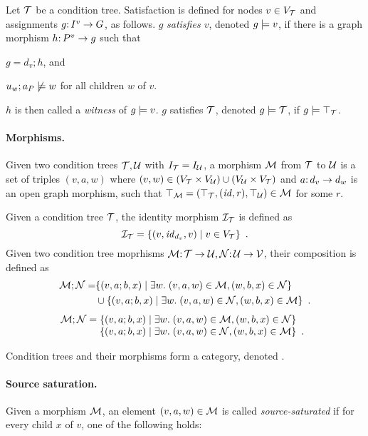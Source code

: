 Let ${\mathcal{T}}$ be a condition tree. Satisfaction is defined for nodes $v\in V_{\mathcal{T}}$ and assignments $g{:}\, I^v\rightarrow G$, as follows. $g$ \emph{satisfies $v$}, denoted $g\models v$, if there is a graph morphism $h{:}\, P^v\rightarrow g$ such that
\begin{inumerate}
\item $g=d_v;h$, and 
\item $u_w;a_P\not\models w$ for all children $w$ of $v$.
\end{inumerate}
$h$ is then called a \emph{witness} of $g\models v$.
$g$ satisfies ${\mathcal{T}}$, denoted $g\models{\mathcal{T}}$, if $g\models\top_{{\mathcal{T}}}$.

\paragraph{Morphisms.}

Given two condition trees ${\mathcal{T}},{\mathcal{U}}$ with $I_{\mathcal{T}}=I_{\mathcal{U}}$, a morphism ${\mathcal{M}}$ from ${\mathcal{T}}$ to ${\mathcal{U}}$ is a set of triples $(v,a,w)$ where $(v,w)\in (V_{\mathcal{T}}\times V_{\mathcal{U}})\cup (V_{\mathcal{U}}\times V_{\mathcal{T}})$ and $a{:}\, d_v\rightarrow d_w$ is an open graph morphism, such that $\top_{{\mathcal{M}}}=(\top_{{\mathcal{T}}},({\mathit{id}},r),\top_{{\mathcal{U}}})\in {\mathcal{M}}$ for some $r$.

Given a condition tree ${\mathcal{T}}$, the identity morphism ${\mathcal{I}}_{\mathcal{T}}$ is defined as
\[ {\mathcal{I}}_{\mathcal{T}} = \{{(v,{\mathit{id}}_{d_v},v)\mid v\in V_{\mathcal{T}}}\} \enspace. \]
Given two condition tree moprhisms ${\mathcal{M}}{:}\, {\mathcal{T}}\rightarrow {\mathcal{U}},{\mathcal{N}}{:}\, {\mathcal{U}}\rightarrow {\mathcal{V}}$, their composition is defined as
\begin{align*}
{\mathcal{M}};{\mathcal{N}} = 
  & \{{(v,a;b,x) \mid \exists w.\; (v,a,w)\in {\mathcal{M}}, (w,b,x)\in {\mathcal{N}}}\} \\
  & \cup \{{(v,a;b,x) \mid \exists w.\; (v,a,w)\in {\mathcal{N}}, (w,b,x)\in {\mathcal{M}}}\} \enspace.
\end{align*}
\[ \cM;\cN =
\begin{array}[t]{@{}l}
	\setof{(v,a;b,x) \mid \exists w\st (v,a,w)\in \cM, (w,b,x)\in \cN} \\
	\setof{(v,a;b,x) \mid \exists w\st (v,a,w)\in \cN, (w,b,x)\in \cM} \enspace.
\end{array}
\]

\begin{proposition}
Condition trees and their morphisms form a category, denoted {\NC}.
\end{proposition}

\paragraph{Source saturation.}

Given a morphism ${\mathcal{M}}$, an element $(v,a,w)\in {\mathcal{M}}$ is called \emph{source-saturated} if for every child $x$ of $v$, one of the following holds:

